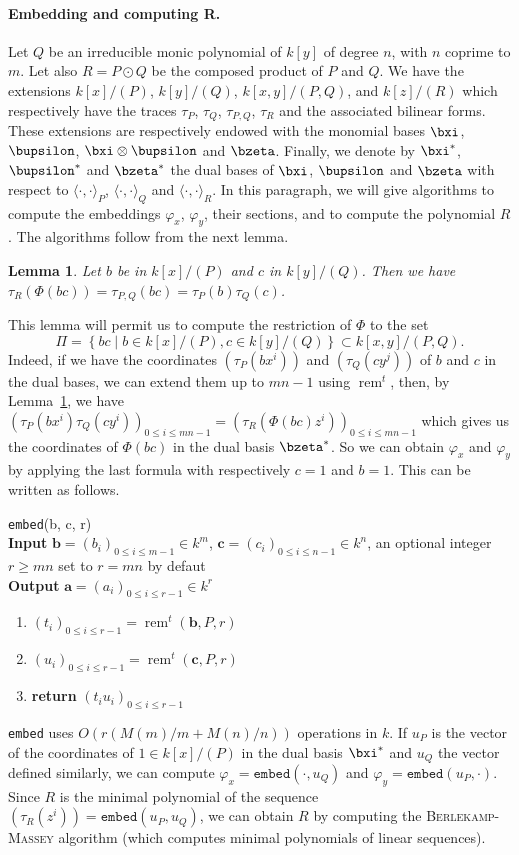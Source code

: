 \documentclass[a4paper,11pt]{article}
\theoremstyle{break}
\newtheorem{lm}[thm]{Lemma}
\theoremstyle{definition}
\theoremstyle{remark}
\DeclareMathOperator{\rem}{rem}
\newcommand{\ps}[2]{\langle#1,#2\rangle}
\newcommand{\psdot}{\ps{\cdot}{\cdot}}
\newcommand{\remt}{\rem^t}
\begin{document}
\paragraph{Embedding and computing R.} Let $Q$ be an irreducible monic
polynomial of $k[y]$ of degree $n$, with $n$ coprime to $m$. Let also $R=P\odot
Q$ be the composed product of $P$ and $Q$. We have the extensions $k[x]/(P)$,
$k[y]/(Q)$, $k[x,y]/(P,Q)$, and $k[z]/(R)$ which respectively have the traces
$\tau_P$, $\tau_Q$, $\tau_{P,Q}$, $\tau_R$ and the associated bilinear forms.
These extensions are respectively endowed with the monomial bases $\bxi$,
$\bupsilon$, $\bxi\otimes\bupsilon$ and $\bzeta$. Finally, we denote by
$\bxi^*$, $\bupsilon^*$ and $\bzeta^*$ the dual bases of $\bxi$, $\bupsilon$ and
$\bzeta$ with respect to $\psdot_P$, $\psdot_Q$ and $\psdot_R$. In this paragraph, we will
give algorithms to compute the embeddings $\varphi_x$, $\varphi_y$, their
sections, and to compute the polynomial $R$. The algorithms follow from the next
lemma.
\begin{lm}
  \label{lm-trac}
  Let $b$ be in $k[x]/(P)$ and $c$ in $k[y]/(Q)$. Then we have
  $\tau_R(\Phi(bc))=\tau_{P,Q}(bc)=\tau_P(b)\tau_Q(c)$.
\end{lm}
This lemma will permit us to compute the restriction of $\Phi$ to the set 
\[
  \Pi=\left\{ bc \;|\; b\in k[x]/(P), c\in k[y]/(Q) \right\}\subset
  k[x,y]/(P,Q).
\]
Indeed, if we have the coordinates $(\tau_P(bx^i))$ and $(\tau_Q(cy^j))$ of $b$ and
$c$ in the dual bases, we can extend them up to $mn-1$ using $\remt$, then, by Lemma~\ref{lm-trac}, we have
$(\tau_P(bx^i)\tau_Q(cy^i))_{0\leq i \leq mn-1}=(\tau_R(\Phi(bc)z^i))_{0\leq i
\leq mn-1}$ which gives us the coordinates of $\Phi(bc)$ in the dual basis
$\bzeta^*$. So we can obtain $\varphi_x$ and $\varphi_y$ by applying the last
formula with respectively $c=1$ and $b=1$. This can be written as follows.
\newline

\texttt{embed}(b, c, r)\\
\textbf{Input} $\textbf{b}=(b_i)_{0\leq i\leq m-1}\in k^m$,
$\textbf{c}=(c_i)_{0\leq i\leq n-1}\in k^n$, an optional integer $r\geq mn$ set
to $r=mn$ by defaut\\
\textbf{Output} $\textbf{a}=(a_i)_{0\leq i\leq r-1}\in k^r$
\begin{enumerate}
  \item $(t_i)_{0\leq i \leq r-1}=\remt(\textbf{b},P,r)$
  \item $(u_i)_{0\leq i \leq r-1}=\remt(\textbf{c},P,r)$
  \item \textbf{return} $(t_iu_i)_{0\leq i \leq r-1}$
\end{enumerate}
\texttt{embed} uses $O(r(M(m)/m + M(n)/n))$ operations in $k$.
If $u_P$ is the vector of the coordinates of $1\in k[x]/(P)$ in the dual basis
$\bxi^*$ and $u_Q$ the vector defined similarly, we can compute
$\varphi_x=\texttt{embed}(\cdot,u_Q)$ and $\varphi_y=\texttt{embed}(u_P,\cdot)$.
Since $R$ is the minimal polynomial of the sequence
$(\tau_R(z^i))=\texttt{embed}(u_P,u_Q)$, we can obtain $R$ by computing the
\textsc{Berlekamp-Massey} algorithm (which computes minimal polynomials of linear
sequences).
\end{document}
